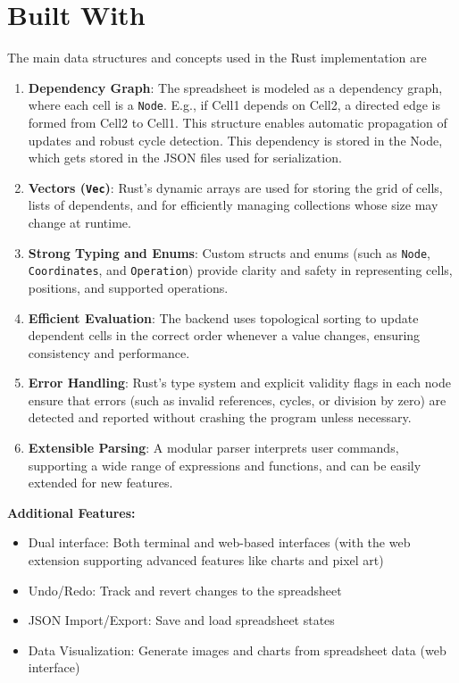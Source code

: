 \documentclass{article}
\begin{document}
\section{Built With}
The main data structures and concepts used in the Rust implementation are
\begin{enumerate}
    \item \textbf{Dependency Graph}: The spreadsheet is modeled as a dependency graph, where each cell is a \texttt{Node}. E.g., if Cell1 depends on Cell2, a directed edge is formed from Cell2 to Cell1. This structure enables automatic propagation of updates and robust cycle detection. This dependency is stored in the Node, which gets stored in the JSON files used for serialization.
    \item \textbf{Vectors (\texttt{Vec})}: Rust's dynamic arrays are used for storing the grid of cells, lists of dependents, and for efficiently managing collections whose size may change at runtime.
    \item \textbf{Strong Typing and Enums}: Custom structs and enums (such as \texttt{Node}, \texttt{Coordinates}, and \texttt{Operation}) provide clarity and safety in representing cells, positions, and supported operations.
    \item \textbf{Efficient Evaluation}: The backend uses topological sorting to update dependent cells in the correct order whenever a value changes, ensuring consistency and performance.
    \item \textbf{Error Handling}: Rust's type system and explicit validity flags in each node ensure that errors (such as invalid references, cycles, or division by zero) are detected and reported without crashing the program unless necessary.
    \item \textbf{Extensible Parsing}: A modular parser interprets user commands, supporting a wide range of expressions and functions, and can be easily extended for new features.
\end{enumerate}

\noindent
\textbf{Additional Features:}
\begin{itemize}
    \item Dual interface: Both terminal and web-based interfaces (with the web extension supporting advanced features like charts and pixel art)
    \item Undo/Redo: Track and revert changes to the spreadsheet
    \item JSON Import/Export: Save and load spreadsheet states
    \item Data Visualization: Generate images and charts from spreadsheet data (web interface)
\end{itemize}
\end{document}
